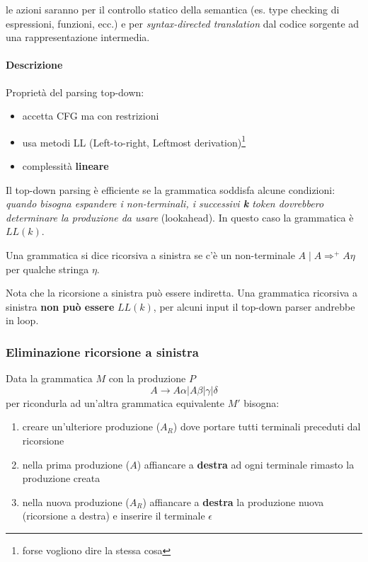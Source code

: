 le azioni saranno per il controllo statico della semantica (es. type
checking di espressioni, funzioni, ecc.) e per \textit{syntax-directed
translation} dal codice sorgente ad una rappresentazione intermedia.

\paragraph{Descrizione}
Propriet\`a del parsing top-down:
\begin{itemize}
\item accetta CFG ma con restrizioni
\item usa metodi LL (Left-to-right, Leftmost derivation)\footnote{forse vogliono
dire la stessa cosa}
\item complessit\`a \textbf{lineare}
\end{itemize}

Il top-down parsing \`e efficiente se la grammatica soddisfa alcune condizioni:
\textit{quando bisogna espandere i non-terminali, i successivi \textbf{k} token
dovrebbero determinare la produzione da usare} (lookahead). In questo caso la
grammatica \`e $LL(k)$.

\begin{definition}
Una grammatica si dice ricorsiva a sinistra se c'\`e un non-terminale $A
\mid A \Rightarrow^+ A\eta$ per qualche stringa $\eta$.
\end{definition}

Nota che la ricorsione a sinistra pu\`o essere indiretta. Una grammatica
ricorsiva a sinistra \textbf{non pu\`o essere} $LL(k)$, per alcuni input il
top-down parser andrebbe in loop.

\subsubsection{Eliminazione ricorsione a sinistra}
Data la grammatica $M$ con la produzione $P$
$$A \to A\alpha | A\beta |  \gamma | \delta$$
per ricondurla ad un'altra grammatica equivalente $M'$ bisogna:
\begin{enumerate}
\item creare un'ulteriore produzione ($A_R$) dove portare tutti terminali
preceduti dal ricorsione
\item nella prima produzione ($A$) affiancare a \textbf{destra} ad ogni
terminale rimasto la produzione creata
\item nella nuova produzione ($A_R$) affiancare a \textbf{destra} la produzione
nuova (ricorsione a destra) e inserire il terminale $\epsilon$
\end{enumerate}


